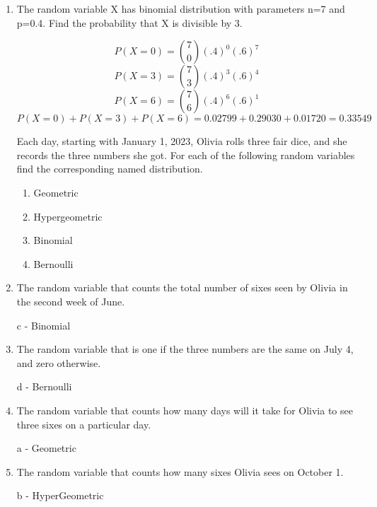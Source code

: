 \documentclass[10pt]{article}
\begin{document}
\begin{enumerate}
\newpage
\item The random variable X has binomial distribution with parameters n=7 and p=0.4. Find the probability that X is divisible by 3. 

  \[ P(X = 0) = \binom{7}{0} (.4)^0 (.6)^7 \]
  \[ P(X = 3) = \binom{7}{3} (.4)^3 (.6)^4 \]
  \[ P(X = 6) = \binom{7}{6} (.4)^6 (.6)^1 \]
  \[ P(X=0) + P(X=3) + P(X=6) =  0.02799 + 0.29030 + 0.01720 = 0.33549 \]

\newpage
Each day, starting with January 1, 2023, Olivia rolls three fair dice, and she records the three numbers she got. For each of the following random variables find the corresponding named distribution.

  \begin{enumerate}
    \item Geometric
    \item Hypergeometric
    \item Binomial
    \item Bernoulli
  \end{enumerate}

 
\item The random variable that counts the total number of sixes seen by Olivia in the second week of June.

  c - Binomial

\item The random variable that is one if the three numbers are the same on July 4, and zero otherwise.

  d - Bernoulli

\item The random variable that counts how many days will it take for Olivia to see three sixes on a particular day.

  a - Geometric

\item The random variable that counts how many sixes Olivia sees on October 1.

  b - HyperGeometric

\end{enumerate}
\end{document}
